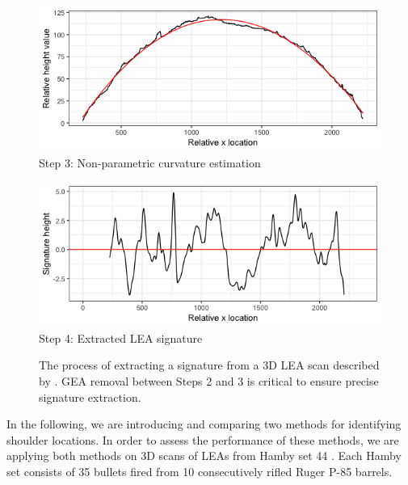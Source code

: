 \documentclass[12pt]{article}
\begin{document}
\begin{figure}
\vspace{.3cm}
\begin{minipage}[b]{0.45\linewidth}
    \raggedleft
    \includegraphics[width=\textwidth]{images/profile_paper_loess}
    \centering
    Step 3: Non-parametric curvature estimation
\end{minipage}
\hspace{.5cm}
\begin{minipage}[b]{0.45\linewidth}
    \raggedright
    \includegraphics[width=\textwidth]{images/signature_paper}
    \centering
    Step 4: Extracted LEA signature
\end{minipage}
\caption{The process of extracting a signature from a 3D LEA scan described by \cite{Hare1}. GEA removal between Steps 2 and 3 is critical to ensure precise signature extraction.}  
\label{fig:process}
\end{figure}

In the following, we are introducing and comparing two methods for
identifying shoulder locations. In order to assess the performance of
these methods, we are applying both methods on 3D scans of LEAs from
Hamby set 44 \citep{Hamby} {\color{teal}{and the Houston-test set}}.
Each Hamby set consists of 35 {\color{teal}{Winchester 9mm copper}}
bullets fired from 10 consecutively rifled Ruger P-85
{\color{teal}{9mm Luger}} barrels.
{\color{teal}{The Houston-test set consists of XXX bullets fired from XXX type of barrels...}}
\end{document}
